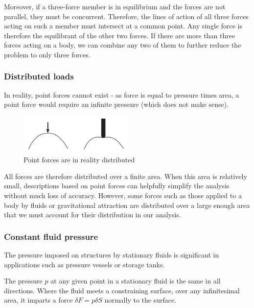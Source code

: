 \documentclass{article}
\begin{document}
Moreover, if a three-force member is in equilibrium and the forces are not parallel, they must be concurrent. Therefore, the lines of action of all three forces acting on such a member must intersect at a common point. Any single force is therefore the equilibrant of the other two forces. If there are more than three forces acting on a body, we can combine any two of them to further reduce the problem to only three forces.

\subsubsection{Distributed loads}

In reality, point forces cannot exist - as force is equal to pressure times area, a point force would require an infinite pressure (which does not make sense).

\begin{figure}[h]
    \centering
    \includegraphics[width = 0.5\textwidth]{images/press.png}
    \caption{Point forces are in reality distributed}
    \label{fig:distributed_loads}
\end{figure}

All forces are therefore distributed over a finite area. When this area is relatively small, descriptions based on point forces can helpfully simplify the analysis without much loss of accuracy. However, some forces such as those applied to a body by fluids or gravitational attraction are distributed over a large enough area that we must account for their distribution in our analysis.

\subsubsection{Constant fluid pressure}

The pressure imposed on structures by stationary fluids is significant in applications such as pressure vessels or storage tanks.

\begin{theorem}
    The pressure $p$ at any given point in a stationary fluid is the same in all directions. Where the fluid meets a constraining surface, over any infinitesimal area, it imparts a force $\delta F = p \delta S$ normally to the surface.
\end{theorem}
\end{document}
